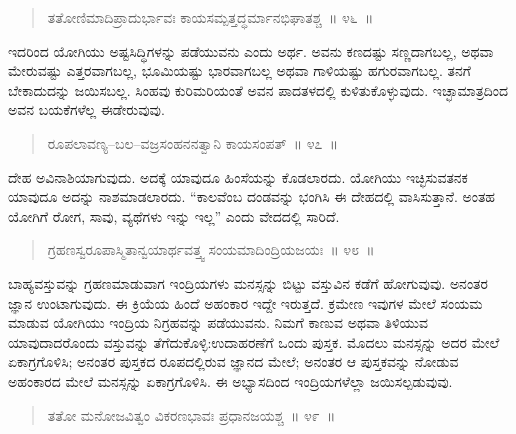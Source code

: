 \begin{verse}
ತತೋಣಿಮಾದಿಪ್ರಾದುರ್ಭಾವಃ ಕಾಯಸಮ್ಪತ್ತದ್ಧರ್ಮಾನಭಿಘಾತಶ್ಚ~॥ ೪೬~॥
\end{verse}

\vspace{-0.3cm}


ಇದರಿಂದ ಯೋಗಿಯು ಅಷ್ಟಸಿದ್ಧಿಗಳನ್ನು ಪಡೆಯುವನು ಎಂದು ಅರ್ಥ. ಅವನು ಕಣದಷ್ಟು ಸಣ್ಣದಾಗಬಲ್ಲ, ಅಥವಾ ಮೇರುವಷ್ಟು ಎತ್ತರವಾಗಬಲ್ಲ, ಭೂಮಿಯಷ್ಟು ಭಾರವಾಗಬಲ್ಲ ಅಥವಾ ಗಾಳಿಯಷ್ಟು ಹಗುರವಾಗಬಲ್ಲ. ತನಗೆ ಬೇಕಾದುದನ್ನು ಜಯಿಸಬಲ್ಲ. ಸಿಂಹವು ಕುರಿಮರಿಯಂತೆ ಅವನ ಪಾದತಳದಲ್ಲಿ ಕುಳಿತುಕೊಳ್ಳುವುದು. ಇಚ್ಛಾಮಾತ್ರದಿಂದ ಅವನ ಬಯಕೆಗಳೆಲ್ಲ ಈಡೇರುವುವು. 

\vspace{-0.3cm}

\begin{verse}
ರೂಪಲಾವಣ್ಯ–ಬಲ–ವಜ್ರಸಂಹನನತ್ವಾನಿ ಕಾಯಸಂಪತ್​~॥ ೪೭~॥
\end{verse}

\vspace{-0.3cm}


ದೇಹ ಅವಿನಾಶಿಯಾಗುವುದು. ಅದಕ್ಕೆ ಯಾವುದೂ ಹಿಂಸೆಯನ್ನು ಕೊಡಲಾರದು. ಯೋಗಿಯು ಇಚ್ಛಿಸುವತನಕ ಯಾವುದೂ ಅದನ್ನು ನಾಶಮಾಡಲಾರದು. “ಕಾಲವೆಂಬ ದಂಡವನ್ನು ಭಂಗಿಸಿ ಈ ದೇಹದಲ್ಲಿ ವಾಸಿಸುತ್ತಾನೆ. ಅಂತಹ ಯೋಗಿಗೆ ರೋಗ, ಸಾವು, ವ್ಯಥೆಗಳು ಇನ್ನು ಇಲ್ಲ” ಎಂದು ವೇದದಲ್ಲಿ ಸಾರಿದೆ. 

\eject

\begin{verse}
ಗ್ರಹಣಸ್ವರೂಪಾಸ್ಮಿತಾನ್ವಯಾರ್ಥವತ್ತ್ವ ಸಂಯಮಾದಿಂದ್ರಿಯಜಯಃ~॥ ೪೮~॥
\end{verse}


ಬಾಹ್ಯವಸ್ತುವನ್ನು ಗ್ರಹಣಮಾಡುವಾಗ ಇಂದ್ರಿಯಗಳು ಮನಸ್ಸನ್ನು ಬಿಟ್ಟು ವಸ್ತುವಿನ ಕಡೆಗೆ ಹೋಗುವುವು. ಅನಂತರ ಜ್ಞಾನ ಉಂಟಾಗುವುದು. ಈ ಕ್ರಿಯೆಯ ಹಿಂದೆ ಅಹಂಕಾರ ಇದ್ದೇ ಇರುತ್ತದೆ. ಕ್ರಮೇಣ ಇವುಗಳ ಮೇಲೆ ಸಂಯಮ ಮಾಡುವ ಯೋಗಿಯು ಇಂದ್ರಿಯ ನಿಗ್ರಹವನ್ನು ಪಡೆಯುವನು. ನಿಮಗೆ ಕಾಣುವ ಅಥವಾ ತಿಳಿಯುವ ಯಾವುದಾದರೊಂದು ವಸ್ತುವನ್ನು ತೆಗೆದುಕೊಳ್ಳಿ:ಉದಾಹರಣೆಗೆ ಒಂದು ಪುಸ್ತಕ. ಮೊದಲು ಮನಸ್ಸನ್ನು ಅದರ ಮೇಲೆ ಏಕಾಗ್ರಗೊಳಿಸಿ; ಅನಂತರ ಪುಸ್ತಕದ ರೂಪದಲ್ಲಿರುವ ಜ್ಞಾನದ ಮೇಲೆ; ಅನಂತರ ಆ ಪುಸ್ತಕವನ್ನು ನೋಡುವ ಅಹಂಕಾರದ ಮೇಲೆ ಮನಸ್ಸನ್ನು ಏಕಾಗ್ರಗೊಳಿಸಿ. ಈ ಅಭ್ಯಾಸದಿಂದ ಇಂದ್ರಿಯಗಳೆಲ್ಲಾ ಜಯಿಸಲ್ಪಡುವುವು. 

\vspace{-0.3cm}

\begin{verse}
ತತೋ ಮನೋಜವಿತ್ವಂ ವಿಕರಣಭಾವಃ ಪ್ರಧಾನಜಯಶ್ಚ~॥ ೪೯~॥
\end{verse}

